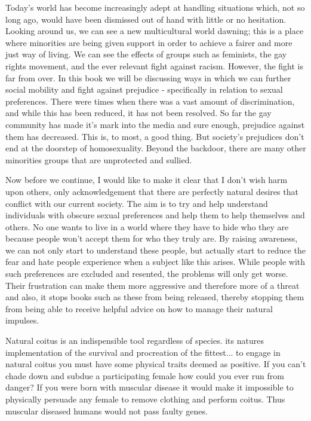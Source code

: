

Today's world has become increasingly adept at handling situations which, not so 
long ago, would have been dismissed out of hand with little or no hesitation. 
Looking around us, we can see a new multicultural world dawning; this is a place 
where minorities are being given support in order to achieve a fairer and more 
just way of living. We can see the effects of groups such as feminists, the gay 
rights movement, and the ever relevant fight against racism. However, the fight 
is far from over. In this book we will be discussing ways in which we can 
further social mobility and fight against prejudice - specifically in relation 
to sexual preferences. There were times when there was a vast amount of 
discrimination, and while this has been reduced, it has not been resolved. So 
far the gay community has made it’s mark into the media and sure enough, 
prejudice against them has decreased. This is, to most, a good thing. But 
society's prejudices don't end at the doorstep of homosexuality. Beyond the 
backdoor, there are many other minorities groups that are unprotected and 
sullied.


Now before we continue, I would like to make it clear that I don't wish harm 
upon others, only acknowledgement that there are perfectly natural desires that 
conflict with our current society. The aim is to try and help understand 
individuals with obscure sexual preferences and help them to help themselves and 
others. No one wants to live in a world where they have to hide who they are 
because people won't accept them for who they truly are. By raising awareness, 
we can not only start to understand these people, but actually start to reduce 
the fear and hate people experience when a subject like this arises. While 
people with such preferences are excluded and resented, the problems will only 
get worse. Their frustration can make them more aggressive and therefore more of 
a threat and also, it stops books such as these from being released, thereby 
stopping them from being able to receive helpful advice on how to manage their 
natural impulses.


Natural coitus is an indispensible tool regardless of species. its natures 
implementation of the survival and procreation of the fittest... to engage in 
natural coitus you must have some physical traits deemed as positive. If you 
can't chade down and subdue a participating female how could you ever run from 
danger? If you were born with muscular disease it would make it impossible to 
physically persuade any female to remove clothing and perform coitus. Thus 
muscular diseased humans would not pass faulty genes.

